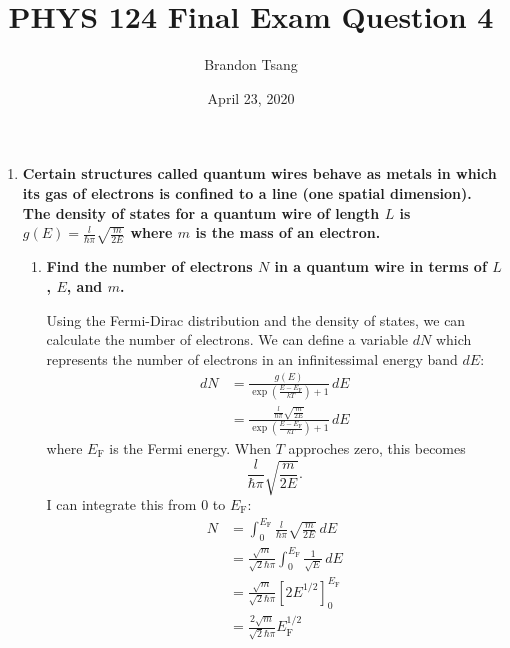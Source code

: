 \documentclass[11pt]{article}
\title{PHYS 124 Final Exam Question 4}
\author{Brandon Tsang}
\date{April 23, 2020}
\begin{document}
    \maketitle
    \begin{enumerate}[label=\textbf{\arabic*.}, start=4]
        \item{
            \textbf{\boldmath Certain structures called quantum wires behave as metals in which its gas of electrons is confined to a line (one spatial dimension). The density of states for a quantum wire of length \(L\) is \(g(E)=\frac{l}{\hbar\pi}\sqrt{\frac{m}{2E}}\) where \(m\) is the mass of an electron.}
            \begin{enumerate}[label=\textbf{(\alph*)}]
                \item{
                    \textbf{\boldmath Find the number of electrons \(N\) in a quantum wire in terms of \(L\), \(E\), and \(m\).}
                    \par
                    Using the Fermi-Dirac distribution and the density of states, we can calculate the number of electrons. We can define a variable \(dN\) which represents the number of electrons in an infinitessimal energy band \(dE\):
                    \begin{align*}
                        dN&=\frac{g(E)}{\exp\left(\frac{E-E_\mathrm{F}}{kT}\right)+1}\,dE \\
                        &=\frac{\frac{l}{\hbar\pi}\sqrt{\frac{m}{2E}}}{\exp\left(\frac{E-E_\mathrm{F}}{kT}\right)+1}\,dE
                    \end{align*}
                    where \(E_\mathrm{F}\) is the Fermi energy. When \(T\) approches zero, this becomes \[\frac{l}{\hbar\pi}\sqrt{\frac{m}{2E}}.\]
                    I can integrate this from 0 to \(E_\mathrm{F}\):
                    \begin{align*}
                        N&=\int_0^{E_\mathrm{F}}\frac{l}{\hbar\pi}\sqrt{\frac{m}{2E}}\,dE \\
                        &=\frac{\sqrt m}{\sqrt{2}\hbar\pi}\int_0^{E_\mathrm{F}}\frac{1}{\sqrt{E}}\,dE \\
                        &=\frac{\sqrt m}{\sqrt{2}\hbar\pi}\left[2E^{1/2}\right]_0^{E_\mathrm{F}} \\
                        &=\frac{2\sqrt m}{\sqrt{2}\hbar\pi}E_\mathrm{F}^{1/2}
                    \end{align*}
                }
            \end{enumerate}
        }
    \end{enumerate}
\end{document}
